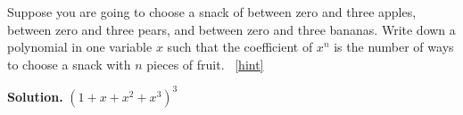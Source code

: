\documentclass{book}
\begin{document}
\setcounter{project}{241}
\addtocounter{project}{-1}
\begin{activity}[]\label{activity-234}
\hypertarget{p-1335}{}%
Suppose you are going to choose a snack of between zero and three apples, between zero and three pears, and between zero and three bananas. Write down a polynomial in one variable \(x\) such that the coefficient of \(x^n\) is the number of ways to choose a snack with \(n\) pieces of fruit.%
~\hfill{\tiny\hyperlink{a-241}{[hint]}\hypertarget{q-241}{}}\par\smallskip%
\noindent\textbf{Solution.}\hypertarget{solution-176}{}\quad%
\hypertarget{p-1337}{}%
\((1+x+x^2+x^3)^3\)%
\end{activity}
\end{document}
